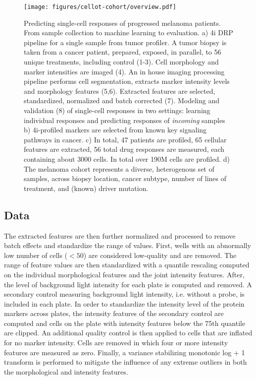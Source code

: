 \begin{figure}[h!]
  \centering
  \texttt{[image: figures/cellot-cohort/overview.pdf]}
  \caption{
    Predicting single-cell responses of progressed melanoma patients.
    From sample collection to machine learning to evaluation.
    a) 4i DRP pipeline for a single sample from tumor profiler.
    A tumor biopsy is taken from a cancer patient, prepared,
    exposed, in parallel, to 56 unique treatments, including control (1-3).
    Cell morphology and marker intensities are imaged (4).
    An in house imaging processing pipeline performs cell segmentation,
    extracts marker intensity levels and morphology features (5,6).
    Extracted features are selected, standardized, normalized and batch corrected (7).
    Modeling and validation (8) of single-cell responses in two settings: learning individual responses and predicting responses of \emph{incoming} samples
    b) 4i-profiled markers are selected from known key signaling pathways in cancer.
    c) In total, 47 patients are profiled, 65 cellular features are extracted, 56 total drug responses are measured, each containing about 3000 cells. In total over 190M cells are profiled.
    d) The melanoma cohort represents a diverse, heterogenous set of samples,
    across biopsy location, cancer subtype, number of lines of treatment, and (known) driver mutation.
  }\label{fig:cellot-cohort-overview}
\end{figure}

\subsection{Data}

The extracted features are then further normalized and processed to remove batch effects and standardize the range of values. First, wells with an abnormally low number of cells ($< 50$) are considered low-quality and are removed.
The range of feature values are then standardized with a quantile rescaling computed on the individual morphological features and the joint intensity features.
After, the level of background light intensity for each plate is computed and removed.
A secondary control measuring background light intensity, i.e. without a probe, is included in each plate. 
In order to standardize the intensity level of the protein markers across plates, the intensity features of the secondary control are computed and cells on the plate with intensity features below the 75th quantile are clipped.
An additional quality control is then applied to cells that are inflated for no marker intensity.
Cells are removed in which four or more intensity features are measured as zero.
Finally, a variance stabilizing monotonic log + 1 transform is performed to mitigate the influence of any extreme outliers in both the morphological and intensity features.

